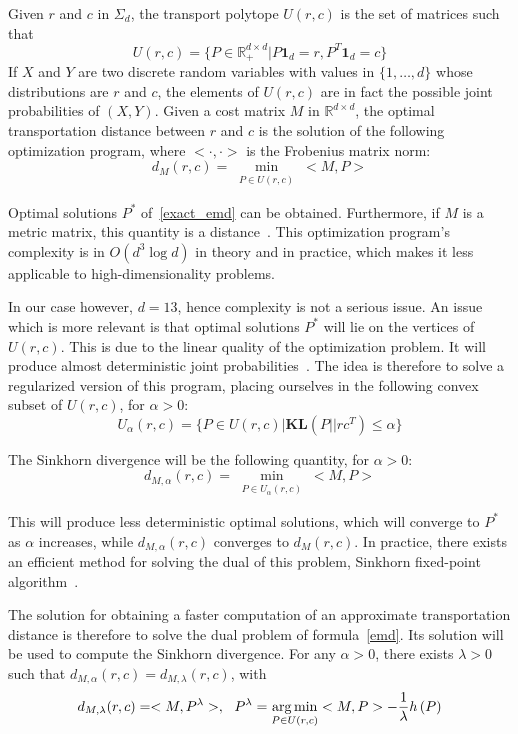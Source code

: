 Given $r$ and $c$ in $\Sigma_d$, the transport polytope $U(r,c)$ is the set of matrices such that 
\[
U(r,c)=\{ P\in \mathbb{R}^{d\times d}_+ | P\mathbf{1}_d = r, P^T \mathbf{1}_d = c \}\] 
If $X$ and $Y$ are two discrete random variables with values in $ \{1,\ldots , d\} $ whose distributions are $r$ and $c$, the elements of $U(r,c)$ are in fact the possible joint probabilities of $\left( X,Y\right)$. Given a cost matrix $M$ in $\mathbb{R}^{d\times d}$, the optimal transportation distance between $r$ and $c$ is the solution of the following optimization program, where $<\cdot, \cdot> $ is the Frobenius matrix norm:
\begin{equation}
d_M(r,c) = \min_{\substack{P\in U(r,c)}} <M,P>
\label{exact_emd}
\end{equation}

Optimal solutions $P^*$ of~\ref{exact_emd} can be obtained. Furthermore, if $M$ is a metric matrix, this quantity is a distance~\cite{Villani}. This optimization program's complexity is in $O\left( d^3\log d\right) $ in theory and in practice, which makes it less applicable to high-dimensionality problems. 

In our case however, $d=13$, hence complexity is not a serious issue. An issue which is more relevant is that optimal solutions $P^*$ will lie on the vertices of $U(r,c)$. This is due to the linear quality of the optimization problem. It will produce almost deterministic joint probabilities~\cite{sinkhorn}. The idea is therefore to solve a regularized version of this program, placing ourselves in the following convex subset of $U(r,c)$, for $\alpha >0$:
\[
U_\alpha\left( r, c\right) = \{ P \in U\left( r,c \right) | \mathbf{KL}\left(P || rc^T\right)\leqslant \alpha\}
\]

The Sinkhorn divergence will be the following quantity, for $\alpha >0$:
\begin{equation}
d_{M, \alpha}(r,c) = \min_{\substack{P\in U_\alpha (r,c)}} <M,P>
\label{emd}
\end{equation}

This will produce less deterministic optimal solutions, which will converge to $P^*$ as $\alpha$ increases, while $d_{M, \alpha}(r,c)$ converges to $d_{M}(r,c)$. In practice, there exists an efficient method for solving the dual of this problem, Sinkhorn fixed-point algorithm~\cite{sinkhorn_original}. 

The solution for obtaining a faster computation of an approximate transportation distance is therefore to solve the dual problem of formula~\ref{emd}. Its solution will be used to compute the Sinkhorn divergence. For any $\alpha >0$, there exists $\lambda >0$ such that $d_{M, \alpha}(r,c) = d_{M, \lambda}(r,c)$, with
\[
d_{M, \lambda}(r,c) = <M,P^\lambda>,~~ P^\lambda = \operatorname*{arg\,min}_{\substack{P\in U (r,c)}} <M,P> - \dfrac{1}{\lambda} h\left( P\right)
\]

